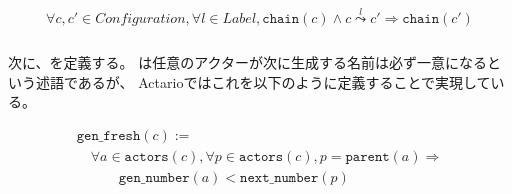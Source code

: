 \begin{lemma}{\chainpreserv}
\begin{displaymath}
  \begin{array}{l}
    \forall c, c' \in \textit{Configuration}, \forall l \in \textit{Label},
    \texttt{chain}(c) \wedge c \overset{l}{\leadsto} c' \Rightarrow \texttt{chain}(c')
  \end{array}
\end{displaymath}
\end{lemma}


\subsubsection{\fresh}

次に、\fresh を定義する。
\fresh は任意のアクターが次に生成する名前は必ず一意になるという述語であるが、
Actarioではこれを以下のように定義することで実現している。

\begin{definition}{\fresh}
\begin{displaymath}
  \begin{array}{l}
    \texttt{gen\_fresh}(c) := \\
    \quad \forall a \in \texttt{actors}(c), \forall p \in \texttt{actors}(c), p = \texttt{parent}(a) \Rightarrow \\
    \quad \quad \quad \texttt{gen\_number}(a) < \texttt{next\_number}(p)
  \end{array}
\end{displaymath}
\end{definition}

